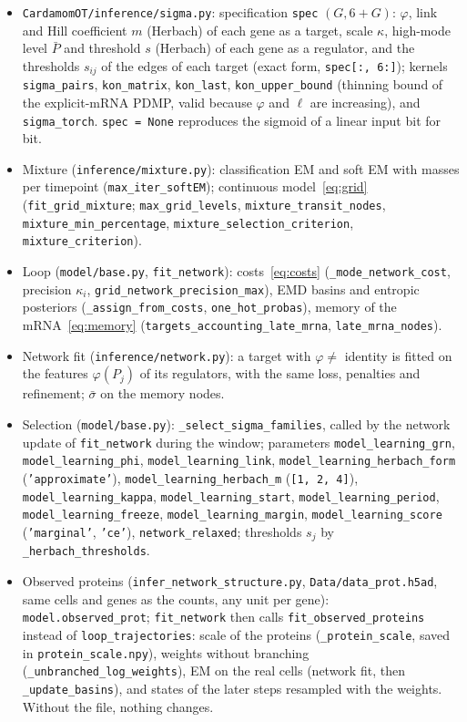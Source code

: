 \documentclass[a4paper, 11pt]{article}
\theoremstyle{plain}
\theoremstyle{remark}
\begin{document}
\begin{itemize}[nosep]
\item \texttt{CardamomOT/inference/sigma.py}: specification \texttt{spec} $(G, 6 + G)$: $\varphi$, link and Hill coefficient $m$ (Herbach) of each gene as a target, scale $\kappa$, high-mode level $\bar P$ and threshold $s$ (Herbach) of each gene as a regulator, and the thresholds $s_{ij}$ of the edges of each target (exact form, \texttt{spec[:, 6:]}); kernels \texttt{sigma\_pairs}, \texttt{kon\_matrix}, \texttt{kon\_last}, \texttt{kon\_upper\_bound} (thinning bound of the explicit-mRNA PDMP, valid because $\varphi$ and $\ell$ are increasing), and \texttt{sigma\_torch}. \texttt{spec = None} reproduces the sigmoid of a linear input bit for bit.
\item Mixture (\texttt{inference/mixture.py}): classification EM and soft EM with masses per timepoint (\texttt{max\_iter\_softEM}); continuous model~\eqref{eq:grid} (\texttt{fit\_grid\_mixture}; \texttt{max\_grid\_levels}, \texttt{mixture\_transit\_nodes}, \texttt{mixture\_min\_percentage}, \texttt{mixture\_selection\_criterion}, \texttt{mixture\_criterion}).
\item Loop (\texttt{model/base.py}, \texttt{fit\_network}): costs~\eqref{eq:costs} (\texttt{\_mode\_network\_cost}, precision $\kappa_i$, \texttt{grid\_network\_precision\_max}), EMD basins and entropic posteriors (\texttt{\_assign\_from\_costs}, \texttt{one\_hot\_probas}), memory of the mRNA~\eqref{eq:memory} (\texttt{targets\_accounting\_late\_mrna}, \texttt{late\_mrna\_nodes}).
\item Network fit (\texttt{inference/network.py}): a target with $\varphi \neq$ identity is fitted on the features $\varphi(P_j)$ of its regulators, with the same loss, penalties and refinement; $\bar\sigma$ on the memory nodes.
\item Selection (\texttt{model/base.py}): \texttt{\_select\_sigma\_families}, called by the network update of \texttt{fit\_network} during the window; parameters \texttt{model\_learning\_grn}, \texttt{model\_learning\_phi}, \texttt{model\_learning\_link}, \texttt{model\_learning\_herbach\_form} (\texttt{'approximate'}), \texttt{model\_learning\_herbach\_m} (\texttt{[1, 2, 4]}), \texttt{model\_learning\_kappa}, \texttt{model\_learning\_start}, \texttt{model\_learning\_period}, \texttt{model\_learning\_freeze}, \texttt{model\_learning\_margin}, \texttt{model\_learning\_score} (\texttt{'marginal'}, \texttt{'ce'}), \texttt{network\_relaxed}; thresholds $s_j$ by \texttt{\_herbach\_thresholds}.
\item Observed proteins (\texttt{infer\_network\_structure.py}, \texttt{Data/data\_prot.h5ad}, same cells and genes as the counts, any unit per gene): \texttt{model.observed\_prot}; \texttt{fit\_network} then calls \texttt{fit\_observed\_proteins} instead of \texttt{loop\_trajectories}: scale of the proteins (\texttt{\_protein\_scale}, saved in \texttt{protein\_scale.npy}), weights without branching (\texttt{\_unbranched\_log\_weights}), EM on the real cells (network fit, then \texttt{\_update\_basins}), and states of the later steps resampled with the weights. Without the file, nothing changes.

\end{itemize}
\end{document}
